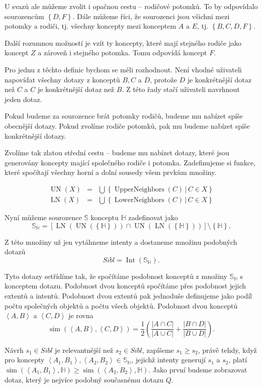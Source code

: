\documentclass{article}
\newcommand{\sep}{\,|\,}
\newcommand{\addk}[1]{\left(#1\right)}
\newcommand{\addh}[1]{\left[#1\right]}
\newcommand{\adds}[1]{\left\{#1\right\}}
\newcommand{\addsp}[1]{\left<#1\right>}
\DeclareMathOperator{\intfca}{Int}
\DeclareMathOperator{\lowerneighbors}{LowerNeighbors}
\DeclareMathOperator{\upperneighbors}{UpperNeighbors}
\DeclareMathOperator{\unfca}{UN}
\DeclareMathOperator{\lnfca}{LN}
\DeclareMathOperator{\simfca}{sim}
\newcommand{\hledany}{\mathbb{H}}
\newcommand{\sibl}{\mathbb{S}}
\begin{document}
U svazů ale můžeme zvolit i opačnou cestu -- rodičové potomků. To by odpovídalo sourozencům $\adds{D, F}$. Dále můžeme říci, že sourozenci jsou všichni mezi potomky a rodiči, tj. všechny koncepty mezi konceptem $A$ a $E$, tj. $\adds{B, C, D, F}$. 

Další rozumnou možností je vzít ty koncepty, které mají stejného rodiče jako koncept $Z$ a zároveň i stejného potomka. Tomu odpovídá koncept $F$.

Pro jednu z těchto definic bychom se měli rozhodnout. Není vhodné uživateli napovídat všechny dotazy z konceptů $B, C$ a $D$, protože $D$ je konkrétnější dotaz než $C$ a $C$ je konkrétnější dotaz než $B$. Z této řady stačí uživateli navrhnout jeden dotaz. 

Pokud budeme za sourozence brát potomky rodičů, budeme mu nabízet spíše obecnější dotazy. Pokud zvolíme rodiče potomků, pak mu budeme nabízet spíše konkrétnější dotazy. 

Zvolíme tak zlatou střední cestu -- budeme mu nabízet dotazy, které jsou generovány koncepty mající společného rodiče i potomka. Zadefinujeme si funkce, které spočítají všechny horní a dolní sousedy všem prvkům množiny.

\begin{eqnarray}
\unfca(X)&=&\bigcup\adds{\upperneighbors(C)\sep C\in X}\\
\lnfca(X)&=&\bigcup\adds{\lowerneighbors(C)\sep C\in X}
\end{eqnarray}

Nyní můžeme sourozence $\sibl$ konceptu $\hledany$ zadefinovat jako
$$
\sibl_\hledany = \addh{\lnfca(\unfca(\adds{\hledany}))\cap\unfca(\lnfca(\adds{\hledany}))}\setminus\adds{\hledany}.
$$

Z této množiny už jen vytáhneme intenty a dostaneme množinu podobných dotazů
$$
Sibl=\intfca(\sibl_\hledany).
$$

Tyto dotazy setřídíme tak, že spočítáme podobnost konceptů z množiny $\sibl_\hledany$ s konceptem dotazu. Podobnost dvou konceptů spočítáme přes podobnost jejich extentů a intentů. Podobnost dvou extentů pak jednoduše definujeme jako podíl počtu společných objektů a počtu všech objektů. Podobnost dvou konceptů $\addsp{A, B}$ a $\addsp{C, D}$ je rovna
$$
\simfca(\addsp{A, B}, \addsp{C, D}) = \frac12\addk{\frac{|A\cap C|}{|A\cup C|} + \frac{|B\cap D|}{|B\cup D|}}.
$$

Návrh $s_1\in Sibl$ je relevantnější než $s_2\in Sibl$, zapíšeme $s_1\ge s_2$, právě tehdy, když pro koncepty $\addsp{A_1, B_1}, \addsp{A_2, B_2} \in \sibl_\hledany$, jejichž intenty generují $s_1$ a $s_2$, platí $\simfca(\addsp{A_1, B_1}, \hledany)\ge\simfca(\addsp{A_2, B_2}, \hledany)$. Jako první budeme zobrazovat dotaz, který je nejvíce podobný současnému dotazu $Q$.
\end{document}
